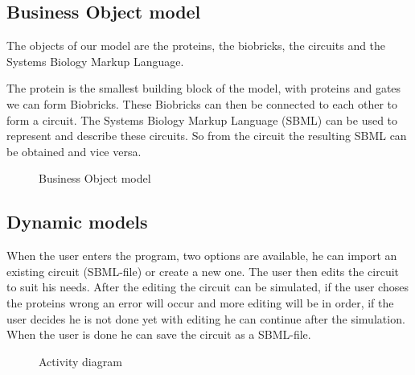 \documentclass[a4paper]{article}
\begin{document}
\pagebreak
\subsection{Business Object model} %
The objects of our model are the proteins, the biobricks, the circuits and the Systems Biology Markup Language.

The protein is the smallest building block of the model, with proteins and gates we can form Biobricks. These Biobricks can then be connected to each other to form a circuit. The Systems Biology Markup Language (SBML) can be used to represent and describe these circuits. So from the circuit the resulting SBML can be obtained and vice versa.
\begin{figure}[h!]
	\caption{Business Object model}
	\centering
\end{figure}

\subsection{Dynamic models}
When the user enters the program, two options are available, he can import an existing circuit (SBML-file) or create a new one. The user then edits the circuit to suit his needs. After the editing the circuit can be simulated, if the user choses the proteins wrong an error will occur and more editing will be in order, if the user decides he is not done yet with editing he can continue after the simulation. When the user is done he can save the circuit as a SBML-file.
\begin{figure}[h!]
	\label{fig-gui}	
	\caption{Activity diagram}
	\centering
\end{figure}
\pagebreak



\pagebreak
\end{document}
